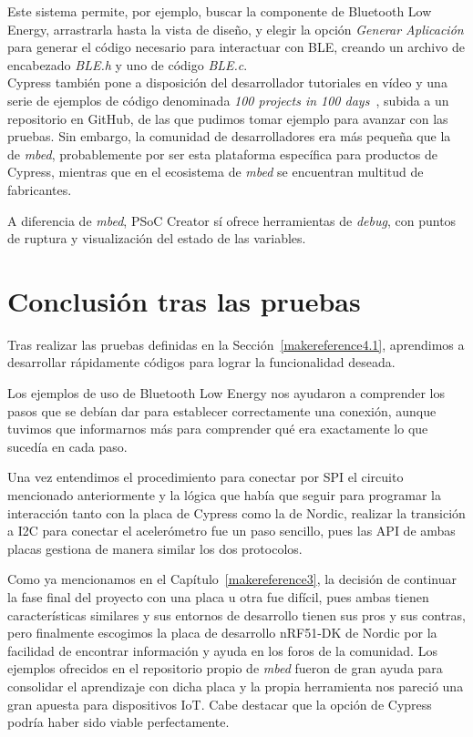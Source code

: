 Este sistema permite, por ejemplo, buscar la componente de Bluetooth Low Energy, arrastrarla hasta la vista de diseño, y elegir la opción \textit{Generar Aplicación} para generar el código necesario para interactuar con BLE, creando un archivo de encabezado \textit{BLE.h} y uno de código \textit{BLE.c}.\\

Cypress también pone a disposición del desarrollador tutoriales en vídeo y una serie de ejemplos de código denominada \textit{100 projects in 100 days}~\cite{100Projects}, subida a un repositorio en GitHub, de las que pudimos tomar ejemplo para avanzar con las pruebas.
Sin embargo, la comunidad de desarrolladores era más pequeña que la de \emph{mbed}, probablemente por ser esta plataforma específica para productos de Cypress, mientras que en el ecosistema de \emph{mbed} se encuentran multitud de fabricantes.

A diferencia de \emph{mbed}, PSoC Creator sí ofrece herramientas de \textit{debug}, con puntos de ruptura y visualización del estado de las variables.

\section{Conclusión tras las pruebas}
\label{makereference4.3}

Tras realizar las pruebas definidas en la Sección~\ref{makereference4.1}, aprendimos a desarrollar rápidamente códigos para lograr la funcionalidad deseada. 

Los ejemplos de uso de Bluetooth Low Energy nos ayudaron a comprender los pasos que se debían dar para establecer correctamente una conexión, aunque tuvimos que informarnos más para comprender qué era exactamente lo que sucedía en cada paso.

Una vez entendimos el procedimiento para conectar por SPI el circuito mencionado anteriormente y la lógica que había que seguir para programar la interacción tanto con la placa de Cypress como la de Nordic, realizar la transición a I2C para conectar el acelerómetro fue un paso sencillo, pues las API de ambas placas gestiona de manera similar los dos protocolos.

Como ya mencionamos en el Capítulo~\ref{makereference3}, la decisión de continuar la fase final del proyecto con una placa u otra fue difícil, pues ambas tienen características similares y sus entornos de desarrollo tienen sus pros y sus contras, pero finalmente escogimos la placa de desarrollo nRF51-DK de Nordic por la facilidad de encontrar información y ayuda en los foros de la comunidad. Los ejemplos ofrecidos en el repositorio propio de \emph{mbed} fueron de gran ayuda para consolidar el aprendizaje con dicha placa y la propia herramienta nos pareció una gran apuesta para dispositivos IoT. Cabe destacar que la opción de Cypress podría haber sido viable perfectamente.